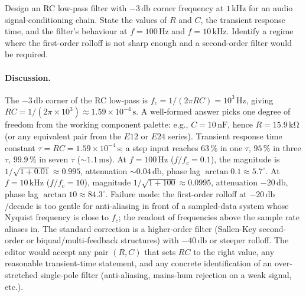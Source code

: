 \begin{exercise}
Design an RC low-pass filter with $-3\,\si{\decibel}$ corner
frequency at $1\,\si{\kilo\hertz}$ for an audio signal-conditioning
chain. State the values of $R$ and $C$, the transient response
time, and the filter's behaviour at $f = 100\,\si{\hertz}$ and
$f = 10\,\si{\kilo\hertz}$. Identify a regime where the
first-order rolloff is not sharp enough and a second-order
filter would be required.

\paragraph{Discussion.} The $-3\,\si{\decibel}$ corner of the RC
low-pass is $f_{c} = 1/(2 \pi R C) = 10^{3}\,\si{\hertz}$, giving
$R C = 1/(2 \pi \times 10^{3}) \approx 1.59 \times 10^{-4}\,
\si{\second}$. A well-formed answer picks one degree of freedom
from the working component palette: e.g., $C = 10\,\si{\nano
\farad}$, hence $R = 15.9\,\si{\kilo\ohm}$ (or any equivalent
pair from the $E12$ or $E24$ series). Transient response time
constant $\tau = R C = 1.59 \times 10^{-4}\,\si{\second}$; a step
input reaches $63\,\%$ in one $\tau$, $95\,\%$ in three $\tau$,
$99.9\,\%$ in seven $\tau$ ($\sim 1.1\,\si{\milli\second}$). At
$f = 100\,\si{\hertz}$ ($f/f_{c} = 0.1$), the magnitude is
$1/\sqrt{1 + 0.01} \approx 0.995$, attenuation $\sim 0.04\,
\si{\decibel}$, phase lag $\arctan 0.1 \approx 5.7^{\circ}$. At
$f = 10\,\si{\kilo\hertz}$ ($f/f_{c} = 10$), magnitude $1/
\sqrt{1 + 100} \approx 0.0995$, attenuation $-20\,\si{\decibel}$,
phase lag $\arctan 10 \approx 84.3^{\circ}$. Failure mode: the
first-order rolloff at $-20\,\si{\decibel}$/decade is too gentle
for anti-aliasing in front of a sampled-data system whose
Nyquist frequency is close to $f_{c}$; the readout of frequencies
above the sample rate aliases in. The standard correction is a
higher-order filter (Sallen-Key second-order or
biquad/multi-feedback structures) with $-40\,\si{\decibel}$ or
steeper rolloff. The editor would accept any pair $(R, C)$ that
sets $R C$ to the right value, any reasonable transient-time
statement, and any concrete identification of an over-stretched
single-pole filter (anti-aliasing, mains-hum rejection on a
weak signal, etc.).
\end{exercise}

